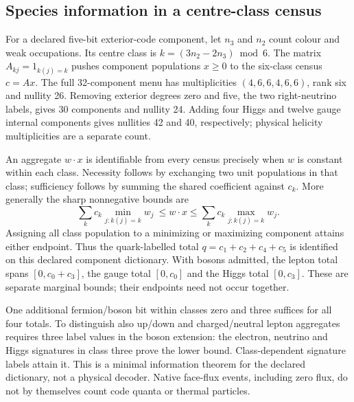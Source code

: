 \subsection{Species information in a centre-class census}
\label{sec:species-identifiability}

For a declared five-bit exterior-code component, let $n_3$ and $n_2$
count colour and weak occupations. Its centre class is
$k=(3n_2-2n_3)\bmod6$. The matrix $A_{kj}=1_{k(j)=k}$ pushes component
populations $x\ge0$ to the six-class census $c=Ax$. The full 32-component
menu has multiplicities $(4,6,6,4,6,6)$, rank six and nullity 26.
Removing exterior degrees zero and five, the two right-neutrino labels,
gives 30 components and nullity 24. Adding four Higgs and twelve gauge
internal components gives nullities 42 and 40, respectively; physical
helicity multiplicities are a separate count.

An aggregate $w\cdot x$ is identifiable from every census precisely when
$w$ is constant within each class. Necessity follows by exchanging two unit
populations in that class; sufficiency follows by summing the shared
coefficient against $c_k$. More generally the sharp nonnegative bounds are
\[
 \sum_k c_k\min_{j:k(j)=k}w_j\ \le w\cdot x\le
 \sum_k c_k\max_{j:k(j)=k}w_j.
\]
Assigning all class population to a minimizing or maximizing component
attains either endpoint. Thus the quark-labelled total
$q=c_1+c_2+c_4+c_5$ is identified on this declared component dictionary.
With bosons admitted, the lepton total spans $[0,c_0+c_3]$, the gauge
total $[0,c_0]$ and the Higgs total $[0,c_3]$. These are separate marginal
bounds; their endpoints need not occur together.

One additional fermion/boson bit within classes zero and three suffices
for all four totals. To distinguish also up/down and charged/neutral
lepton aggregates requires three label values in the boson extension:
the electron, neutrino and Higgs signatures in class three prove the lower
bound. Class-dependent signature labels attain it. This is a minimal
information theorem for the declared dictionary, not a physical decoder.
Native face-flux events, including zero flux, do not by themselves count
code quanta or thermal particles.

